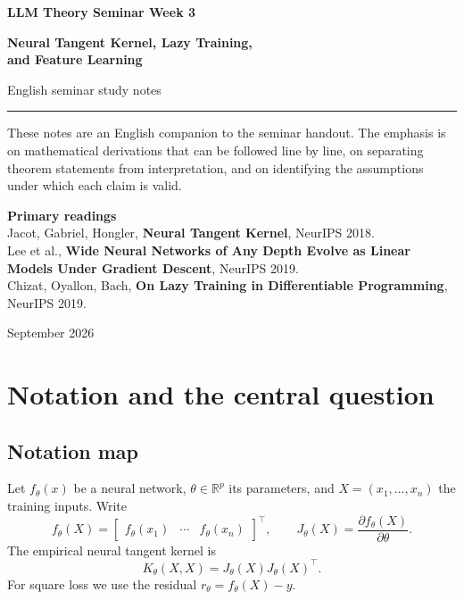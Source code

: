 \documentclass[11pt,a4paper,oneside,openany]{memoir}
\newcommand{\R}{\mathbb{R}}
\theoremstyle{definition}
\begin{document}
\begin{titlingpage}
\thispagestyle{empty}
\vspace*{1.2cm}
{\small\bfseries LLM Theory Seminar \hfill Week 3\par}
\vspace{1.4cm}
{\HUGE\bfseries Neural Tangent Kernel, Lazy Training,\\[0.18em]and Feature Learning\par}
\vspace{0.55cm}
{\large English seminar study notes\par}
\vspace{0.9cm}
\rule{\textwidth}{0.7pt}
\vspace{1.1cm}
\begin{minipage}{0.86\textwidth}
\small
These notes are an English companion to the seminar handout.  The emphasis is on
mathematical derivations that can be followed line by line, on separating theorem
statements from interpretation, and on identifying the assumptions under which each
claim is valid.
\end{minipage}
\vfill
{\small\textbf{Primary readings}\\[0.25em]
Jacot, Gabriel, Hongler, \textbf{Neural Tangent Kernel}, NeurIPS 2018.\\Lee et al., \textbf{Wide Neural Networks of Any Depth Evolve as Linear Models Under Gradient Descent}, NeurIPS 2019.\\Chizat, Oyallon, Bach, \textbf{On Lazy Training in Differentiable Programming}, NeurIPS 2019.
\par}
\vspace{0.8cm}
{\small September 2026\par}
\end{titlingpage}
\tableofcontents*
\clearpage

\chapter{Notation and the central question}
\section{Notation map}
Let $f_\theta(x)$ be a neural network, $\theta\in\R^p$ its parameters, and $X=(x_1,\ldots,x_n)$ the training inputs.  Write
\[
f_\theta(X)=\begin{bmatrix}f_\theta(x_1)&\cdots&f_\theta(x_n)\end{bmatrix}^\top,
\qquad
J_\theta(X)=\frac{\partial f_\theta(X)}{\partial \theta}.
\]
The empirical neural tangent kernel is
\[
K_\theta(X,X)=J_\theta(X)J_\theta(X)^\top.
\]
For square loss we use the residual $r_\theta=f_\theta(X)-y$.
\end{document}
